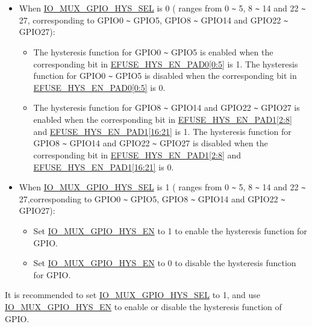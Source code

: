 \documentclass[main\_\_EN.tex]{subfiles}
\begin{document}
\begin{itemize}
    \item When \hyperref[fielddesc:IOMUXGPIONHYSSEL]{IO\_MUX\_GPIO\_HYS\_SEL} is 0 ( ranges from 0 \verb+~+ 5, 8 \verb+~+ 14 and 22 \verb+~+ 27, corresponding to GPIO0 \verb+~+ GPIO5, GPIO8 \verb+~+ GPIO14 and GPIO22 \verb+~+ GPIO27):
    \begin{itemize}
        \item The hysteresis function for GPIO0  \verb +~+ GPIO5 is enabled when the corresponding bit in  \hyperref[fielddesc:EFUSEHYSENPAD0]{EFUSE\_HYS\_EN\_PAD0[0:5]} is 1. The hysteresis function for GPIO0  \verb +~+ GPIO5 is disabled when the corresponding bit in  \hyperref[fielddesc:EFUSEHYSENPAD0]{EFUSE\_HYS\_EN\_PAD0[0:5]} is 0.
        \item The hysteresis function for GPIO8 \verb+~+ GPIO14 and GPIO22 \verb+~+ GPIO27 is enabled when the corresponding bit in   \hyperref[fielddesc:EFUSEHYSENPAD1]{EFUSE\_HYS\_EN\_PAD1[2:8]} and \hyperref[fielddesc:EFUSEHYSENPAD1]{EFUSE\_HYS\_EN\_PAD1[16:21]} is 1. The hysteresis function for GPIO8 \verb+~+ GPIO14 and GPIO22 \verb+~+ GPIO27 is disabled when the corresponding bit in   \hyperref[fielddesc:EFUSEHYSENPAD1]{EFUSE\_HYS\_EN\_PAD1[2:8]} and \hyperref[fielddesc:EFUSEHYSENPAD1]{EFUSE\_HYS\_EN\_PAD1[16:21]} is 0.
    \end{itemize}
    \item When \hyperref[fielddesc:IOMUXGPIONHYSSEL]{IO\_MUX\_GPIO\_HYS\_SEL} is 1 ( ranges from 0 \verb+~+ 5, 8 \verb+~+ 14 and 22 \verb+~+ 27,corresponding to GPIO0 \verb+~+ GPIO5, GPIO8 \verb+~+ GPIO14 and GPIO22 \verb+~+ GPIO27):
    \begin{itemize}
        \item Set \hyperref[fielddesc:IOMUXGPIONHYSEN]{IO\_MUX\_GPIO\_HYS\_EN} to 1 to enable the hysteresis function for GPIO.
        \item Set \hyperref[fielddesc:IOMUXGPIONHYSEN]{IO\_MUX\_GPIO\_HYS\_EN} to 0 to disable the hysteresis function for GPIO.
    \end{itemize}
\end{itemize}

It is recommended to set \hyperref[fielddesc:IOMUXGPIONHYSSEL]{IO\_MUX\_GPIO\_HYS\_SEL} to 1, and use \hyperref[fielddesc:IOMUXGPIONHYSEN]{IO\_MUX\_GPIO\_HYS\_EN} to enable or disable the hysteresis function of GPIO.
\end{document}
